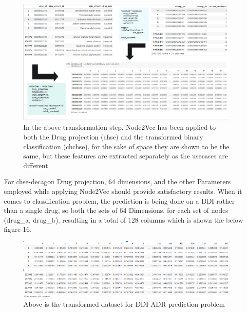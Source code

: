 \documentclass[journal,transmag]{J-NaNA}
\begin{document}
\begin{figure}[htbp]
\centering
\includegraphics[width=\linewidth]{Node2Vec_biosnap.PNG} 
\caption{In the above transformation step, Node2Vec has been applied to both the Drug projection (chse) and the transformed binary classification (chchse), for the sake of space they are shown to be the same, but these features are extracted separately as the usecases are different} 
\label{fig: Node2Vec Feature Extraction technique} %
\end{figure}
For chse-decagon Drug projection, 64 dimensions, and the other Parameters employed while applying Node2Vec should provide satisfactory results. When it comes to classification problem, the prediction is being done on a DDI rather than a single drug, so both the sets of 64 Dimensions, for each set of nodes (drug\_a, drug\_b), resulting in a total of 128 columns which is shown the below figure 16. 
\begin{figure}[htbp]
\centering
\includegraphics[width=\linewidth]{node2vec-chchse.PNG} 
\caption{Above is the transformed dataset for DDI-ADR prediction problem} 
\label{fig: Node2Vec Feature Extraction technique for chchse} %
\end{figure}
\end{document}
